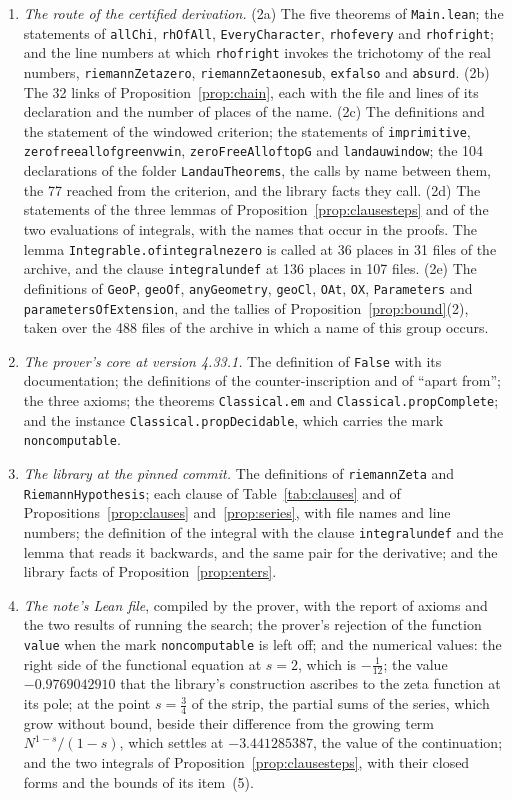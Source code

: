 \documentclass[11pt]{article}
\theoremstyle{definition}
\theoremstyle{remark}
\DeclareRobustCommand{\lean}[1]{{\renewcommand{\_}{\textunderscore\allowbreak}\texttt{#1}}}
\newcommand{\False}{\lean{False}}
\begin{document}
\begin{enumerate}[leftmargin=2em,itemsep=1pt]
\item \emph{The route of the certified derivation.} (2a) The five theorems of \lean{Main.lean}; the statements of \lean{allChi}, \lean{rhOfAll}, \lean{EveryCharacter}, \lean{rh\_of\_every} and \lean{rh\_of\_right}; and the line numbers at which \lean{rh\_of\_right} invokes the trichotomy of the real numbers, \lean{riemannZeta\_zero}, \lean{riemannZeta\_one\_sub}, \lean{exfalso} and \lean{absurd}. (2b) The 32 links of Proposition~\ref{prop:chain}, each with the file and lines of its declaration and the number of places of the name. (2c) The definitions and the statement of the windowed criterion; the statements of \lean{imprimitive}, \lean{zero\_free\_all\_of\_green\_v\_win}, \lean{zeroFreeAll\_of\_topG} and \lean{landau\_window}; the 104 declarations of the folder \lean{LandauTheorems}, the calls by name between them, the 77 reached from the criterion, and the library facts they call. (2d) The statements of the three lemmas of Proposition~\ref{prop:clausesteps} and of the two evaluations of integrals, with the names that occur in the proofs. The lemma \lean{Integrable.of\_integral\_ne\_zero} is called at 36 places in 31 files of the archive, and the clause \lean{integral\_undef} at 136 places in 107 files. (2e) The definitions of \lean{GeoP}, \lean{geoOf}, \lean{anyGeometry}, \lean{geoCl}, \lean{OAt}, \lean{OX}, \lean{Parameters} and \lean{parametersOfExtension}, and the tallies of Proposition~\ref{prop:bound}(2), taken over the 488 files of the archive in which a name of this group occurs.
\item \emph{The prover's core at version 4.33.1.} The definition of \False{} with its documentation; the definitions of the counter-inscription and of ``apart from''; the three axioms; the theorems \lean{Classical.em} and \lean{Classical.propComplete}; and the instance \lean{Classical.propDecidable}, which carries the mark \lean{noncomputable}.
\item \emph{The library at the pinned commit.} The definitions of \lean{riemannZeta} and \lean{RiemannHypothesis}; each clause of Table~\ref{tab:clauses} and of Propositions~\ref{prop:clauses} and~\ref{prop:series}, with file names and line numbers; the definition of the integral with the clause \lean{integral\_undef} and the lemma that reads it backwards, and the same pair for the derivative; and the library facts of Proposition~\ref{prop:enters}.
\item \emph{The note's Lean file}, compiled by the prover, with the report of axioms and the two results of running the search; the prover's rejection of the function \lean{value} when the mark \lean{noncomputable} is left off; and the numerical values: the right side of the functional equation at $s=2$, which is $-\tfrac1{12}$; the value $-0.9769042910$ that the library's construction ascribes to the zeta function at its pole; at the point $s=\tfrac34$ of the strip, the partial sums of the series, which grow without bound, beside their difference from the growing term $N^{1-s}/(1-s)$, which settles at $-3.441285387$, the value of the continuation; and the two integrals of Proposition~\ref{prop:clausesteps}, with their closed forms and the bounds of its item~(5).

\end{enumerate}
\end{document}
